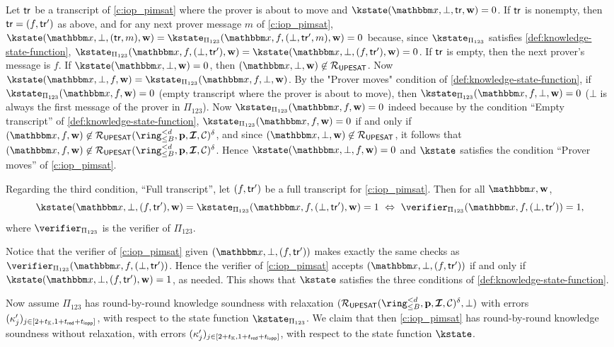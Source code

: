 \documentclass[11pt,letterpaper,usenames,dvipsnames]{article}
\begin{document}
Let $\mathsf{tr}$ be a transcript of \cref{c:iop_pimsat} where the prover is about to move and $\kstate(\inp,\bot,\tr,\ww)=0$. If $\mathsf{tr}$ is nonempty, then $\mathsf{tr}=(f,\mathsf{tr}')$ as above, and  for any next prover message $m$ of \cref{c:iop_pimsat}, $\kstate(\inp,\bot, (\tr, m), \ww)= \kstate_{\Pi_{123}}(\inp,f, (\bot, \tr', m),\ww)=0$ because, since $\kstate_{\Pi_{123}}$ satisfies \cref{def:knowledge-state-function}, $\kstate_{\Pi_{123}}(\inp,f, (\bot, \tr'),\ww)=\kstate(\inp,\bot, (f, \tr'),\ww)=0$. If $\mathsf{tr}$ is empty, then the next prover's message is $f$. If $\kstate(\inp,\bot,\ww)=0$, then $(\inp,\bot,\ww)\not\in \PIMSAT$. Now $\kstate(\inp,\bot, f, \ww) = \kstate_{\Pi_{123}}(\inp, f, \bot,\ww)$. By the "Prover moves" condition of \cref{def:knowledge-state-function}, if $\kstate_{\Pi_{123}}(\inp, f,\ww)=0$ (empty transcript where the prover is about to move), then $\kstate_{\Pi_{123}}(\inp, f, \bot,\ww)=0$ ($\bot$ is always the first message of the prover in $\Pi_{123}$). Now $\kstate_{\Pi_{123}}(\inp, f,\ww)=0$ indeed because by the condition ``Empty transcript'' of \cref{def:knowledge-state-function}, $\kstate_{\Pi_{123}}(\inp, f,\ww)=0$ if and only if $(\inp, f,\ww)\not\in \PIMSAT(\ringtwobounds{B}{\moduledegree}, \pp,\bm{\ideal}, \cC)^\delta$, and since $(\inp,\bot,\ww)\not\in \PIMSAT$, it follows that $(\inp, f,\ww)\not\in \PIMSAT(\ringtwobounds{B}{\moduledegree}, \pp,\bm{\ideal}, \cC)^\delta$.  Hence $\kstate(\inp,\bot, f, \ww)=0$ and $\kstate$ satisfies the condition ``Prover moves'' of \cref{c:iop_pimsat}.
 

 Regarding the third condition, ``Full transcript'', let $(f,\mathsf{tr}')$ be a full transcript for \cref{c:iop_pimsat}.  Then for all $\inp,\ww$,
%
$$
\kstate(\inp,\bot,(f,\tr'),\ww) = \kstate_{\Pi_{123}}(\inp,f,(\bot,\tr'), \ww) = 1 \ \Leftrightarrow \ \verifier_{\Pi_{123}}(\inp,f, (\bot,\tr'))=1, 
$$
%
where $\verifier_{\Pi_{123}}$ is the verifier of $\Pi_{123}$.

Notice that the verifier of \cref{c:iop_pimsat} given $(\inp, \bot, (f,\tr'))$ makes exactly the same checks as $\verifier_{\Pi_{123}}(\inp,f, (\bot,\tr'))$. Hence the verifier of \cref{c:iop_pimsat} accepts $(\inp, \bot, (f,\tr'))$ if and only if $\kstate(\inp,\bot,(f,\tr'),\ww) = 1$, as needed. This shows that $\kstate$ satisfies the three conditions of \cref{def:knowledge-state-function}.




Now assume $\Pi_{123}$ has round-by-round knowledge soundness with relaxation $(\PIMSAT(\ringtwobounds{B}{\moduledegree}, \pp,\bm{\ideal}, \cC)^\delta,\bot)$ with errors $(\kappa_{j}')_{j\in [2+t_{\mathbb{K}}, 1+ t_{\mathsf{red}} +t_{\mathsf{iopp}}]}$, with respect to the state function $\kstate_{\Pi_{123}}$. We claim that then \cref{c:iop_pimsat} has round-by-round knowledge soundness without relaxation, with errors $(\kappa_{j}')_{j\in [2+t_{\mathbb{K}}, 1+ t_{\mathsf{red}} +t_{\mathsf{iopp}}]}$, with respect to the state function $\kstate$.
\end{document}

